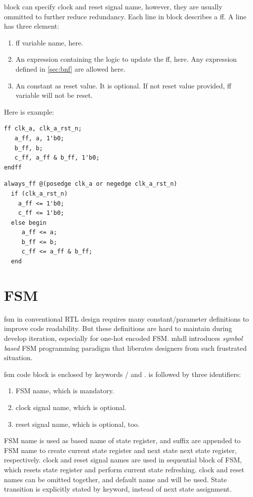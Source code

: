  block can specify clock and reset signal name, however, they are 
usually ommitted to further reduce redundancy. Each line in  block
describes a \gls{ff}. A line has three element:
\begin{enumerate}
\item \gls{ff} variable name,  here. 
\item An expression containing the logic to update the \gls{ff},  here. 
  Any expression defined in \autoref{sec:bnf} are allowed here. 
\item An constant as reset value. It is optional. If not reset value provided, 
  \gls{ff} variable will not be reset. 
\end{enumerate}
Here is example:

\begin{minipage}[t]{.48\textwidth}
\begin{lstlisting}[caption={MetaHDL FF syntax}]
ff clk_a, clk_a_rst_n;
   a_ff, a, 1'b0;
   b_ff, b;
   c_ff, a_ff & b_ff, 1'b0;
endff
\end{lstlisting}
\end{minipage}
\hfill
\begin{minipage}[t]{.48\textwidth}
\begin{lstlisting}[caption={Generated SystemVerilog}]
always_ff @(posedge clk_a or negedge clk_a_rst_n)
  if (clk_a_rst_n)
    a_ff <= 1'b0;
    c_ff <= 1'b0;
  else begin
     a_ff <= a;
     b_ff <= b;
     c_ff <= a_ff & b_ff;
  end
\end{lstlisting}
\end{minipage}

\section{FSM}
\gls{fsm} in conventional RTL design requires many
constant/parameter definitions to improve code readability. But these
definitions are hard to maintain during develop iteration, especially
for one-hot encoded FSM. \gls{mhdl} introduces \emph{symbol based} FSM
programming paradigm that liberates designers from such frustrated
situation.

\gls{fsm} \gls{code block}
is enclosed by keywords / and .
 is followed by three identifiers: 
\begin{enumerate}
\item FSM name, which is mandatory.
\item clock signal name, which is optional.
\item reset signal name, which is optional, too. 
\end{enumerate}
FSM name is used as based name of state
register,  and  suffix are appended to FSM name to create
current state register and next state next state register,
respectively. clock and reset signal names are used in sequential block of
FSM, which resets state register and perform current state
refreshing. clock and reset names can be omitted together, and default
name  and  will be used. State transition is explicitly
stated by  keyword, instead of next state assignment.

